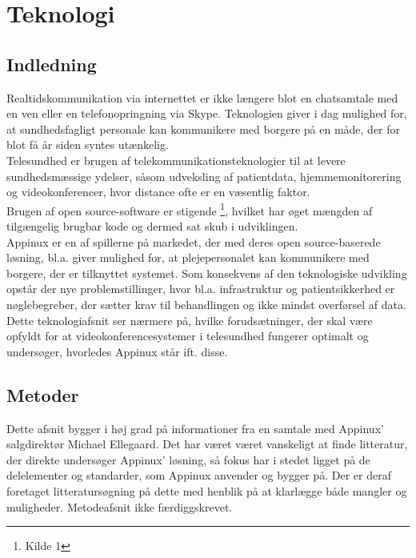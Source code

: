 \chapter{Teknologi}

\section{Indledning}
Realtidskommunikation via internettet er ikke længere blot en chatsamtale med en ven eller en telefonopringning via Skype. Teknologien giver i dag mulighed for, at sundhedsfagligt personale kan kommunikere med borgere på en måde, der for blot få år siden syntes utænkelig.\\Telesundhed er brugen af telekommunikationsteknologier til at levere sundhedsmæssige ydelser, såsom udveksling af patientdata, hjemmemonitorering og videokonferencer, hvor distance ofte er en væsentlig faktor.\\
Brugen af open source-software er stigende \footnote{Kilde 1}, hvilket har øget mængden af tilgængelig brugbar kode og dermed sat skub i udviklingen.
\\
Appinux er en af spillerne på markedet, der med deres open source-baserede løsning, bl.a. giver mulighed for, at plejepersonalet kan kommunikere med borgere, der er tilknyttet systemet. Som konsekvens af den teknologiske udvikling opstår der nye problemstillinger, hvor bl.a. infrastruktur og patientsikkerhed er nøglebegreber, der sætter krav til behandlingen og ikke mindst overførsel af data. Dette teknologiafsnit ser nærmere på, hvilke forudsætninger, der skal være opfyldt for at videokonferencesystemer i telesundhed fungerer optimalt og undersøger, hvorledes Appinux står ift. disse.
\section{Metoder}
Dette afsnit bygger i høj grad på informationer fra en samtale med Appinux' salgdirektør Michael Ellegaard. Det har været været vanskeligt at finde litteratur, der direkte undersøger Appinux' løsning, så fokus har i stedet ligget på de delelementer og standarder, som Appinux anvender og bygger på. Der er deraf foretaget litteratursøgning på dette med henblik på at klarlægge både mangler og muligheder.
Metodeafsnit ikke færdiggskrevet.

